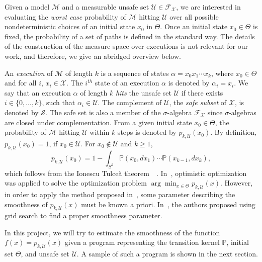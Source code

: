 \documentclass[12pt]{article}
\newcommand{\M}{\mathcal{M}}
\newcommand{\X}{\mathcal{X}}
\newcommand{\F}{\mathcal{F}}
\newcommand{\phit}[3]{{p_{#1,#2}{(#3)}}}
\newcommand{\Unsafe}{\mathcal{U}}
\begin{document}
Given a model $\M$ and a measurable unsafe set $\Unsafe \in \F_\X$, we are interested in evaluating the {\em worst case\/} probability of $\M$ hitting $\Unsafe$ over all possible nondeterministic choices of an initial state $x_0$ in $\Theta$. Once an initial state $x_0 \in \Theta$ is fixed, the probability of a set of paths is defined in the standard way. The details of the construction of the measure space over executions is not relevant for our work, and therefore, we give an abridged overview below.

An {\em execution} of $\M$  of length $k$ is a sequence of states $\alpha = x_0 x_1 \cdots x_k$, where $x_0 \in \Theta$ and for all $i$, $x_i \in \X$. The $i^{\mathit{th}}$ state of an execution $\alpha$ is denoted by $\alpha_i = x_i$. We say that an execution $\alpha$ of length $k$ \emph{hits} the unsafe set $\Unsafe$ if there exists $i\in\{0,\ldots,k\}$, such that  $\alpha_i \in \Unsafe$.
The complement of $\Unsafe$, the  {\em safe subset} of $\X$, is denoted by $\mathcal{S}$. The safe set is also a member of the $\sigma$-algebra $\F_\X$ since $\sigma$-algebras are closed under complementation. From a given initial state $x_0 \in \Theta$, the probability of $\M$ hitting $\Unsafe$ within $k$ steps is denoted by $\phit{k}{\Unsafe}{x_0}$. By definition, $\phit{k}{\Unsafe}{x_0} = 1$, if $x_0 \in \Unsafe$. For $x_0 \notin \Unsafe$ and $k \geq 1$,   
\begin{equation}
\label{eq:prob_int}
\phit{k}{\Unsafe}{x_0} = 1 - \int_{S^k} \mathbb{P}(x_0, dx_1) \cdots \mathbb{P}(x_{k-1}, dx_k),
\end{equation}
which follows from the Ionescu Tulce{\u a} theorem~\cite{ionescu1949mesures}~\cite{petritis2012}. In~\cite{musavi2019verification}, optimistic optimization~\cite{bubeck2009online} was applied to solve the optimization problem $\arg\min_{x \in \Theta} \phit{k}{\Unsafe}{x}$. However, in order to apply the method proposed in~\cite{musavi2019verification}, some parameter describing the smoothness of $\phit{k}{\Unsafe}{x}$ must be known a priori. In~\cite{musavi2019verification}, the authors proposed using grid search to find a proper smoothness parameter.

In this project, we will try to estimate the smoothness of the function $f(x) = \phit{k}{\Unsafe}{x}$ given a program representing the transition kernel $\mathbb{P}$, initial set $\Theta$, and unsafe set $\Unsafe$. A sample of such a program is shown in the next section.
\end{document}
